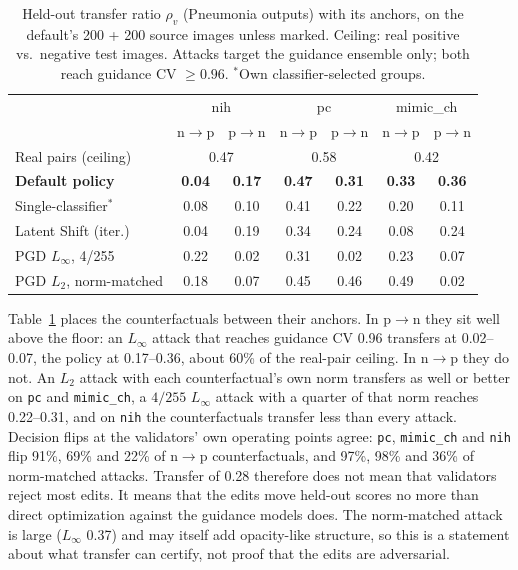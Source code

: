 \begin{table}[t]
\centering
\caption{Held-out transfer ratio $\rho_v$ (Pneumonia outputs) with its anchors, on the default's 200 + 200 source images unless marked. Ceiling: real positive vs.\ negative test images. Attacks target the guidance ensemble only; both reach guidance CV $\geq 0.96$. $^*$Own classifier-selected groups.}
\label{tab:transfer-ratio}
\small
\setlength{\tabcolsep}{3.2pt}
\begin{tabular}{@{}lcccccc@{}}
\toprule
& \multicolumn{2}{c}{nih} & \multicolumn{2}{c}{pc} & \multicolumn{2}{c}{mimic\_ch} \\
& n$\to$p & p$\to$n & n$\to$p & p$\to$n & n$\to$p & p$\to$n \\
\midrule
Real pairs (ceiling) & \multicolumn{2}{c}{0.47} & \multicolumn{2}{c}{0.58} & \multicolumn{2}{c}{0.42} \\
\textbf{Default policy} & \textbf{0.04} & \textbf{0.17} & \textbf{0.47} & \textbf{0.31} & \textbf{0.33} & \textbf{0.36} \\
Single-classifier$^*$ & 0.08 & 0.10 & 0.41 & 0.22 & 0.20 & 0.11 \\
Latent Shift (iter.) & 0.04 & 0.19 & 0.34 & 0.24 & 0.08 & 0.24 \\
PGD $L_\infty$, 4/255 & 0.22 & 0.02 & 0.31 & 0.02 & 0.23 & 0.07 \\
PGD $L_2$, norm-matched & 0.18 & 0.07 & 0.45 & 0.46 & 0.49 & 0.02 \\
\bottomrule
\end{tabular}
\end{table}

Table~\ref{tab:transfer-ratio} places the counterfactuals between their anchors. In p$\to$n they sit well above the floor: an $L_\infty$ attack that reaches guidance CV 0.96 transfers at 0.02--0.07, the policy at 0.17--0.36, about 60\% of the real-pair ceiling. In n$\to$p they do not. An $L_2$ attack with each counterfactual's own norm transfers as well or better on \texttt{pc} and \texttt{mimic\_ch}, a $4/255$ $L_\infty$ attack with a quarter of that norm reaches 0.22--0.31, and on \texttt{nih} the counterfactuals transfer less than every attack. Decision flips at the validators' own operating points agree: \texttt{pc}, \texttt{mimic\_ch} and \texttt{nih} flip 91\%, 69\% and 22\% of n$\to$p counterfactuals, and 97\%, 98\% and 36\% of norm-matched attacks. Transfer of 0.28 therefore does not mean that validators reject most edits. It means that the edits move held-out scores no more than direct optimization against the guidance models does. The norm-matched attack is large ($L_\infty$ 0.37) and may itself add opacity-like structure, so this is a statement about what transfer can certify, not proof that the edits are adversarial.

